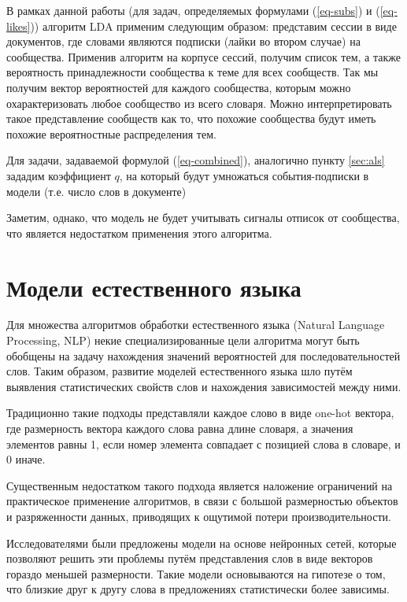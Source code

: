 \documentclass[times,specification,annotation]{itmo-student-thesis}
\begin{document}
В рамках данной работы (для задач, определяемых формулами (\ref{eq-subs}) и (\ref{eq-likes})) алгоритм LDA применим следующим образом: представим сессии в виде документов, где словами являются подписки (лайки во втором случае) на сообщества. Применив алгоритм на корпусе сессий, получим список тем, а также вероятность принадлежности сообщества к теме для всех сообществ. Так мы получим вектор вероятностей для каждого сообщества, которым можно охарактеризовать любое сообщество из всего словаря. Можно интерпретировать такое представление сообществ как то, что похожие сообщества будут иметь похожие вероятностные распределения тем. 

Для задачи, задаваемой формулой (\ref{eq-combined}), аналогично пункту \ref{sec:als} зададим коэффициент $q$, на который будут умножаться события-подписки в модели (т.е. число слов в документе) 
 
Заметим, однако, что модель не будет учитывать сигналы отписок от сообщества, что является недостатком применения этого алгоритма. 

\section{Модели естественного языка}\label{sec:nlp-intro}

Для множества алгоритмов обработки естественного языка (Natural Language Processing, NLP) некие специализированные цели алгоритма могут быть обобщены на задачу нахождения значений вероятностей для последовательностей слов.
Таким образом, развитие моделей естественного языка шло путём выявления статистических свойств слов и нахождения зависимостей между ними.

Традиционно такие подходы представляли каждое слово в виде one-hot вектора, где размерность вектора каждого слова равна длине словаря, а значения элементов равны 1, если номер элемента совпадает с позицией слова в словаре, и 0 иначе.  

Существенным недостатком такого подхода является наложение ограничений на практическое применение алгоритмов, в связи с большой размерностью объектов и разряженности данных, приводящих к ощутимой потери производительности.

Исследователями были предложены модели на основе нейронных сетей\cite{turian2010}, которые позволяют решить эти проблемы путём представления слов в виде векторов гораздо меньшей размерности. Такие модели основываются на гипотезе о том, что близкие друг к другу слова в предложениях статистически более зависимы.
\end{document}
